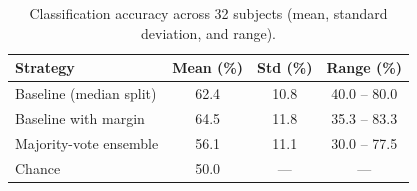 \begin{table}[H]
  \centering
  \caption{Classification accuracy across 32 subjects (mean, standard deviation, and range).}
  \label{tab:results}
  \begin{tabular}{lccc}
    \toprule
    Strategy & Mean (\%) & Std (\%) & Range (\%) \\
    \midrule
    Baseline (median split) & 62.4 & 10.8 & 40.0 -- 80.0 \\
    Baseline with margin & 64.5 & 11.8 & 35.3 -- 83.3 \\
    Majority-vote ensemble & 56.1 & 11.1 & 30.0 -- 77.5 \\
    Chance & 50.0 & --- & --- \\
    \bottomrule
  \end{tabular}
\end{table}
